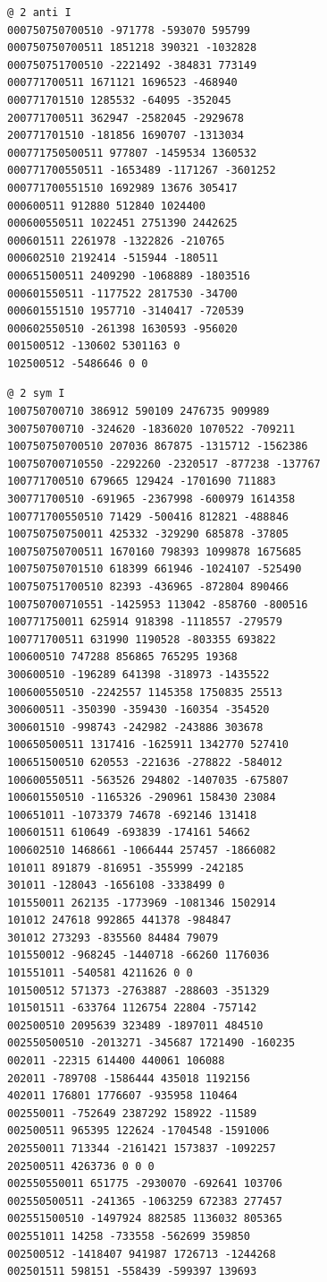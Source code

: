 \begin{Verbatim}[fontsize=\footnotesize]
@ 2 anti I
000750750700510 -971778 -593070 595799
000750750700511 1851218 390321 -1032828
000750751700510 -2221492 -384831 773149
000771700511 1671121 1696523 -468940
000771701510 1285532 -64095 -352045
200771700511 362947 -2582045 -2929678
200771701510 -181856 1690707 -1313034
000771750500511 977807 -1459534 1360532
000771700550511 -1653489 -1171267 -3601252
000771700551510 1692989 13676 305417
000600511 912880 512840 1024400
000600550511 1022451 2751390 2442625
000601511 2261978 -1322826 -210765
000602510 2192414 -515944 -180511
000651500511 2409290 -1068889 -1803516
000601550511 -1177522 2817530 -34700
000601551510 1957710 -3140417 -720539
000602550510 -261398 1630593 -956020
001500512 -130602 5301163 0
102500512 -5486646 0 0
\end{Verbatim}
\begin{Verbatim}[fontsize=\footnotesize]
@ 2 sym I
100750700710 386912 590109 2476735 909989
300750700710 -324620 -1836020 1070522 -709211
100750750700510 207036 867875 -1315712 -1562386
100750700710550 -2292260 -2320517 -877238 -137767
100771700510 679665 129424 -1701690 711883
300771700510 -691965 -2367998 -600979 1614358
100771700550510 71429 -500416 812821 -488846
100750750750011 425332 -329290 685878 -37805
100750750700511 1670160 798393 1099878 1675685
100750750701510 618399 661946 -1024107 -525490
100750751700510 82393 -436965 -872804 890466
100750700710551 -1425953 113042 -858760 -800516
100771750011 625914 918398 -1118557 -279579
100771700511 631990 1190528 -803355 693822
100600510 747288 856865 765295 19368
300600510 -196289 641398 -318973 -1435522
100600550510 -2242557 1145358 1750835 25513
300600511 -350390 -359430 -160354 -354520
300601510 -998743 -242982 -243886 303678
100650500511 1317416 -1625911 1342770 527410
100651500510 620553 -221636 -278822 -584012
100600550511 -563526 294802 -1407035 -675807
100601550510 -1165326 -290961 158430 23084
100651011 -1073379 74678 -692146 131418
100601511 610649 -693839 -174161 54662
100602510 1468661 -1066444 257457 -1866082
101011 891879 -816951 -355999 -242185
301011 -128043 -1656108 -3338499 0
101550011 262135 -1773969 -1081346 1502914
101012 247618 992865 441378 -984847
301012 273293 -835560 84484 79079
101550012 -968245 -1440718 -66260 1176036
101551011 -540581 4211626 0 0
101500512 571373 -2763887 -288603 -351329
101501511 -633764 1126754 22804 -757142
002500510 2095639 323489 -1897011 484510
002550500510 -2013271 -345687 1721490 -160235
002011 -22315 614400 440061 106088
202011 -789708 -1586444 435018 1192156
402011 176801 1776607 -935958 110464
002550011 -752649 2387292 158922 -11589
002500511 965395 122624 -1704548 -1591006
202550011 713344 -2161421 1573837 -1092257
202500511 4263736 0 0 0
002550550011 651775 -2930070 -692641 103706
002550500511 -241365 -1063259 672383 277457
002551500510 -1497924 882585 1136032 805365
002551011 14258 -733558 -562699 359850
002500512 -1418407 941987 1726713 -1244268
002501511 598151 -558439 -599397 139693
\end{Verbatim}
